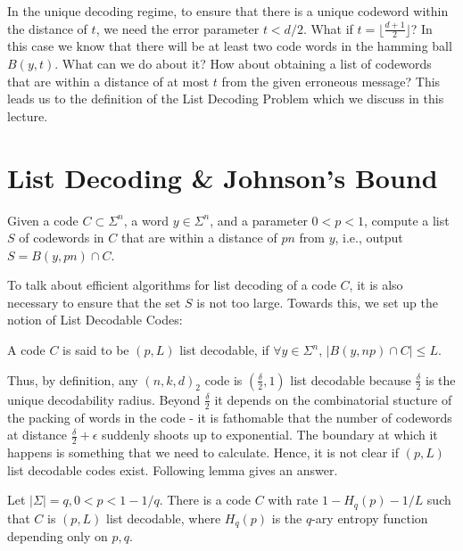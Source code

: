 In the unique decoding regime, to ensure that there is a unique codeword within the distance of $t$, we need  the error parameter $t<d/2$. What if $t=\lfloor\frac{d+1}{2} \rfloor$? In this case we know that 
there will be at least two code words in the hamming ball $B(y,t)$.  What can we do about it? How about obtaining a list of codewords that are within a distance of at most $t$ from the given erroneous message?
This leads us to the definition of  the List Decoding Problem which we discuss in this lecture.

\section{List Decoding \& Johnson's Bound}

\begin{definition}
Given a code $C\subset \Sigma^n$, a word $y\in \Sigma^n$, and a parameter $0<p<1$, compute a list $S$ of codewords in $C$ that are within a distance of $pn$ from $y$, i.e., output $S= B(y,pn)\cap C$.
\end{definition}

To talk about  efficient algorithms for  list decoding of a code $C$, it is also necessary to ensure that the set $S$ is not too large. Towards this, we set up the notion of List Decodable Codes:
\begin{definition}
A code $C$ is said to be $(p,L)$ list decodable, if $\forall y\in \Sigma^n$, $|B(y,np)\cap C|\le L$.
\end{definition}

Thus, by definition, any $(n,k,d)_2$ code is $(\frac{\delta}{2},1)$ list decodable because $\frac{\delta}{2}$ is the unique decodability radius. Beyond $\frac{\delta}{2}$ it depends on the combinatorial stucture of the packing of words in the code - it is fathomable that the number of codewords at distance $\frac{\delta}{2}+\epsilon$ suddenly shoots up to exponential. The boundary at which it happens is something that we need to calculate. Hence, it is not clear  if $(p,L)$ list decodable codes exist. Following lemma gives an answer.
\begin{lemma}
\label{lem:list-exist}
Let $|\Sigma|=q, 0<p<1-1/q$. There is a code $C$ with rate $1-H_q(p)-1/L$ such that $C$ is $(p,L)$ list decodable, where $H_q(p)$ is the $q$-ary entropy function depending only on $p,q$.
\end{lemma}

